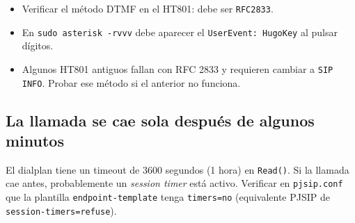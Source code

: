 \begin{itemize}
  \item Verificar el método DTMF en el HT801: debe ser \texttt{RFC2833}.
  \item En \texttt{sudo asterisk -rvvv} debe aparecer el \texttt{UserEvent: HugoKey} al pulsar dígitos.
  \item Algunos HT801 antiguos fallan con RFC 2833 y requieren cambiar a \texttt{SIP INFO}. Probar ese método si el anterior no funciona.
\end{itemize}

\subsection{La llamada se cae sola después de algunos minutos}

El dialplan tiene un timeout de 3600 segundos (1 hora) en \texttt{Read()}. Si la llamada cae antes, probablemente un \emph{session timer} está activo. Verificar en \texttt{pjsip.conf} que la plantilla \texttt{endpoint-template} tenga \texttt{timers=no} (equivalente PJSIP de \texttt{session-timers=refuse}).
